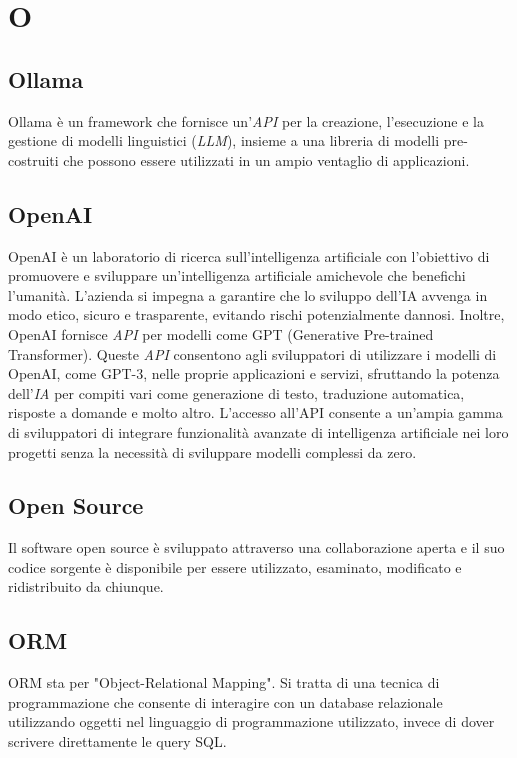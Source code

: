 \chapter{O}

\section{Ollama}
Ollama è un framework che fornisce un’\emph{API} per la creazione, l’esecuzione e la gestione di modelli linguistici (\emph{LLM}), insieme a una libreria di modelli pre-costruiti che possono essere utilizzati in un ampio ventaglio di applicazioni.

\section{OpenAI}
OpenAI è un laboratorio di ricerca sull'intelligenza artificiale con l'obiettivo di promuovere e sviluppare un'intelligenza artificiale amichevole che benefichi l'umanità. L'azienda si impegna a garantire che lo sviluppo dell'IA avvenga in modo etico, sicuro e trasparente, evitando rischi potenzialmente dannosi.
Inoltre, OpenAI fornisce \emph{API} per modelli come GPT (Generative Pre-trained Transformer). Queste \emph{API} consentono agli sviluppatori di utilizzare i modelli di OpenAI, come GPT-3, nelle proprie applicazioni e servizi, sfruttando la potenza dell'\emph{IA} per compiti vari come generazione di testo, traduzione automatica, risposte a domande e molto altro. L'accesso all'API consente a un'ampia gamma di sviluppatori di integrare funzionalità avanzate di intelligenza artificiale nei loro progetti senza la necessità di sviluppare modelli complessi da zero.

\section{Open Source}
Il software open source è sviluppato attraverso una collaborazione aperta e il suo codice sorgente è disponibile per essere utilizzato, esaminato, modificato e ridistribuito da chiunque. 

\section{ORM}\label{sec:Object-Relational Mapping}
ORM sta per "Object-Relational Mapping". Si tratta di una tecnica di programmazione che consente di interagire con un database relazionale utilizzando oggetti nel linguaggio di programmazione utilizzato, invece di dover scrivere direttamente le query SQL.
